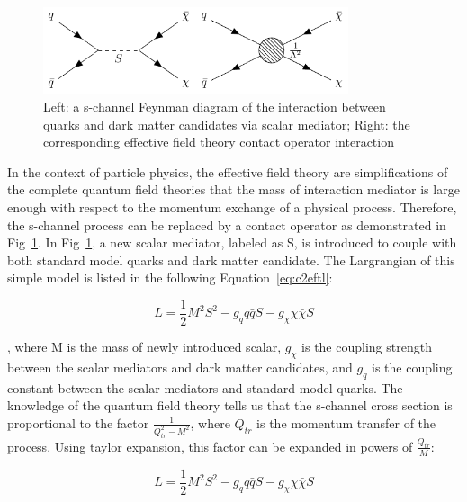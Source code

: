 \begin{figure}[htbp]
  \begin{center}
    \includegraphics[width=0.8\textwidth]{chapters/c2/figures/eft-feyn-diagram}
  \end{center}
  \caption{Left: a s-channel Feynman diagram of the interaction between quarks and dark matter candidates via scalar mediator; Right: the corresponding effective field theory contact operator interaction}
  \label{fig:c2eftfeyndiagram}
\end{figure}

In the context of particle physics, the effective field theory are simplifications of the complete quantum field theories that the mass of interaction mediator is large enough with respect to the momentum exchange of a physical process. Therefore, the s-channel process can be replaced by a contact operator as demonstrated in Fig~\ref{fig:c2eftfeyndiagram}. In Fig~\ref{fig:c2eftfeyndiagram}, a new scalar mediator, labeled as S, is introduced to couple with both standard model quarks and dark matter candidate. The Largrangian of this simple model is listed in the following Equation~\ref{eq:c2eftl}:

\begin{equation}
  L = \frac{1}{2}M^{2}S^{2}-g_{q}q\bar{q}S-g_{\chi}\chi\bar{\chi}S
  \label{eq:c2eftl}
\end{equation}

, where M is the mass of newly introduced scalar, $g_{\chi}$ is the coupling strength between the scalar mediators and dark matter candidates, and $g_{q}$ is the coupling constant between the scalar mediators and standard model quarks. The knowledge of the quantum field theory tells us that the s-channel cross section is proportional to the factor $\frac{1}{Q_{tr}^{2}-M^{2}}$, where $Q_{tr}$ is the momentum transfer of the process. Using taylor expansion, this factor can be expanded in powers of $\frac{Q_{tr}}{M}$: 

\begin{equation}
  L = \frac{1}{2}M^{2}S^{2}-g_{q}q\bar{q}S-g_{\chi}\chi\bar{\chi}S
  \label{eq:c2taylorexp}
\end{equation}

